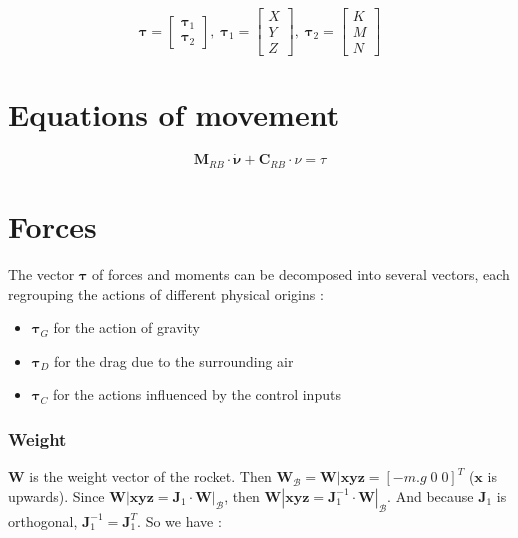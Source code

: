 \documentclass[a4paper, 12 pt]{article}
\begin{document}
$$\bm\tau = \left[ 
\begin{array}{c}
\bm{\tau}_1	\\
\bm{\tau}_2
\end{array}
\right], \; \bm{\tau}_1 = \left[ 
\begin{array}{c}
X	\\
Y	\\
Z
\end{array}
\right], \; 
{\bm\tau}_2 = \left[ 
\begin{array}{c}
K	\\
M	\\
N
\end{array}
\right]$$

\section{Equations of movement}

$$\bm M_{RB}\cdot \bm \dot{\nu} + \bm C_{RB}\cdot \nu = \tau$$

\section{Forces}

The vector $\bm \tau$ of forces and moments can be decomposed into several vectors, each regrouping the actions of different physical origins :

\begin{itemize}
\item $\bm {\tau}_G$ for the action of gravity
\item $\bm {\tau}_D$ for the drag due to the surrounding air
\item $\bm {\tau}_C$ for the actions influenced by the control inputs
\end{itemize}

\subsubsection{Weight}

$\bm W$ is the weight vector of the rocket.
Then $\bm W_{\mathcal{B}} = \bm W|{\bm x\bm y\bm z} = [-m.g \; 0 \; 0]^T$ ($\bm x$ is upwards).
Since $\bm W|{\bm x\bm y\bm z} = \bm J_1\cdot \bm W|_{\mathcal{B}}$, 
then $\bm W|{\bm x\bm y\bm z} = \bm J_1^{-1}\cdot \bm W|_{\mathcal{B}}$.
And because $\bm J_1$ is orthogonal, $\bm J_1^{-1} = \bm J_1^T$. So we have :
\end{document}
